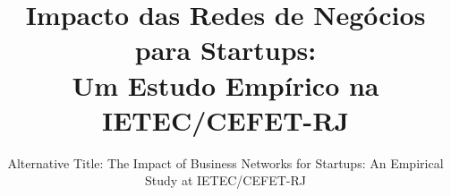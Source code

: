 \documentclass{sig-alternate-05-2015}
\begin{document}






%

\title{Impacto das Redes de Negócios para Startups: \\Um Estudo Empírico na IETEC/CEFET-RJ}
\subtitle{Alternative Title: The Impact of Business Networks for Startups: An Empirical Study at IETEC/CEFET-RJ}
%
%
%
%
%
\end{document}
